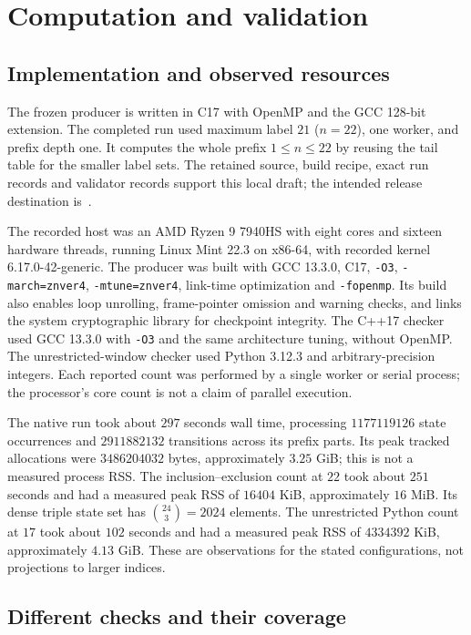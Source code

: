 \documentclass[11pt]{article}
\theoremstyle{definition}
\theoremstyle{remark}
\begin{document}
\section{Computation and validation}
\label{sec:validation}

\subsection{Implementation and observed resources}

The frozen producer is written in C17 with OpenMP and the GCC 128-bit
extension. The completed run used maximum label $21$ ($n=22$), one worker,
and prefix depth one. It computes the whole prefix $1\leq n\leq22$ by
reusing the tail table for the smaller label sets. The retained source,
build recipe, exact run records and validator records support this local
draft; the intended release destination is~\cite{corti}.

The recorded host was an AMD Ryzen 9 7940HS with eight cores and sixteen
hardware threads, running Linux Mint 22.3 on x86-64, with recorded kernel
6.17.0-42-generic. The producer
was built with GCC 13.3.0, C17, \texttt{-O3}, \texttt{-march=znver4},
\texttt{-mtune=znver4}, link-time optimization and \texttt{-fopenmp}.
Its build also enables loop unrolling, frame-pointer omission and warning
checks, and links the system cryptographic library for checkpoint integrity.
The C++17 checker used GCC 13.3.0 with \texttt{-O3} and the same architecture
tuning, without OpenMP. The unrestricted-window checker used Python 3.12.3
and arbitrary-precision integers. Each reported count was performed by a
single worker or serial process; the processor's core count is not a claim
of parallel execution.

The native run took about $297$ seconds wall time, processing
$1177119126$ state occurrences and $2911882132$ transitions
across its prefix parts. Its peak tracked allocations were $3486204032$
bytes, approximately $3.25$ GiB; this is not a measured process RSS.
The inclusion--exclusion count at $22$ took about $251$ seconds and had a
measured peak RSS of $16404$ KiB, approximately $16$ MiB. Its dense triple
state set has $\binom{24}{3}=2024$ elements. The unrestricted Python count
at $17$ took about $102$ seconds and had a measured peak RSS of
$4334392$ KiB, approximately $4.13$ GiB. These are observations for the
stated configurations, not projections to larger indices.

\subsection{Different checks and their coverage}
\end{document}
